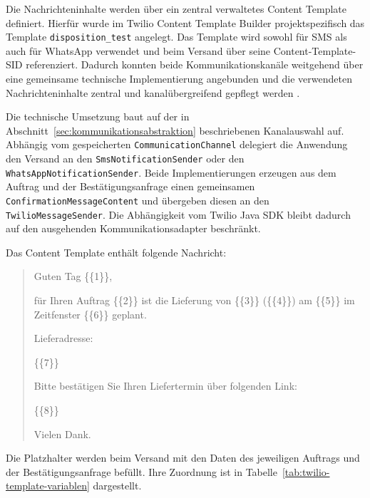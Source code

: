 Die Nachrichteninhalte werden über ein zentral verwaltetes
Content Template definiert. Hierfür wurde im Twilio Content
Template Builder projektspezifisch das Template
\texttt{disposition\_test} angelegt. Das Template wird sowohl
für SMS als auch für WhatsApp verwendet und beim Versand über
seine Content-Template-SID referenziert. Dadurch konnten beide
Kommunikationskanäle weitgehend über eine gemeinsame technische
Implementierung angebunden und die verwendeten Nachrichteninhalte
zentral und kanalübergreifend gepflegt werden \parencite{twilioContentTemplates}.

Die technische Umsetzung baut auf der in
Abschnitt~\ref{sec:kommunikationsabstraktion} beschriebenen
Kanalauswahl auf. Abhängig vom gespeicherten \texttt{CommunicationChannel} delegiert die Anwendung den
Versand an den \texttt{SmsNotificationSender} oder den
\texttt{Whats\allowbreak{}App\allowbreak{}Notification\allowbreak{}Sender}. Beide Implementierungen
erzeugen aus dem Auftrag und der Bestätigungsanfrage einen
gemeinsamen \texttt{Confirmation\allowbreak{}Message\allowbreak{}Content} und übergeben
diesen an den \texttt{TwilioMessageSender}. Die Abhängigkeit
vom Twilio Java SDK bleibt dadurch auf den ausgehenden
Kommunikationsadapter beschränkt.

Das Content Template enthält folgende Nachricht:

\begin{quote}
\small\ttfamily
Guten Tag \{\{1\}\},\par\medskip
für Ihren Auftrag \{\{2\}\} ist die Lieferung von
\{\{3\}\} (\{\{4\}\}) am \{\{5\}\} im Zeitfenster
\{\{6\}\} geplant.\par\medskip
Lieferadresse:\par
\{\{7\}\}\par\medskip
Bitte bestätigen Sie Ihren Liefertermin über folgenden Link:\par
\{\{8\}\}\par\medskip
Vielen Dank.
\end{quote}

Die Platzhalter werden beim Versand mit den Daten des jeweiligen
Auftrags und der Bestätigungsanfrage befüllt. Ihre Zuordnung ist
in Tabelle~\ref{tab:twilio-template-variablen} dargestellt.

